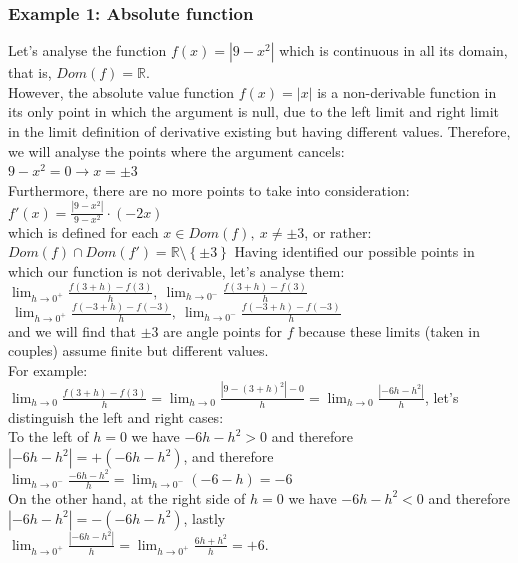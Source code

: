 \documentclass[a4paper]{report}
\begin{document}
\subsubsection{Example 1: Absolute function}
\begin{tcolorbox}
Let's analyse the function $f\left ( x \right )=\left | 9-x^{2} \right |$ which is continuous in all its domain, that is, $Dom\left ( f \right )=\mathbb{R}$.\\
However, the absolute value function $f\left ( x \right )=\left | x \right |$ is a non-derivable function in its only point in which the argument is null, due to the left limit and right limit in the limit definition of derivative existing but having different values. Therefore, we will analyse the points where the argument cancels:\\ $9-x^{2}=0\rightarrow x = \pm 3$\\Furthermore, there are no more points to take into consideration:\\
$f'\left ( x \right )=\frac{\left | 9-x^{2} \right |}{9-x^{2}}\cdot\left ( -2x \right )$\\which is defined for each $x\in Dom\left ( f \right ),\ x \neq \pm 3$, or rather:\\ $Dom\left ( f \right )\cap Dom\left ( f' \right )=\mathbb{R}\setminus\left \{  \pm3 \right \}$
\tcblower
Having identified our possible points in which our function is not derivable, let's analyse them:\\
$\lim_{h \to 0^{+}} \frac{f\left ( 3+h \right )-f\left ( 3 \right )}{h},\ \lim_{h \to 0^{-}} \frac{f\left ( 3+h \right )-f\left ( 3 \right )}{h}$\\$\ \lim_{h \to 0^{+}} \frac{f\left ( -3+h \right )-f\left ( -3 \right )}{h},\ \lim_{h \to 0^{-}} \frac{f\left ( -3+h \right )-f\left ( -3 \right )}{h}$\\and we will find that $\pm 3$ are angle points for $f$ because these limits (taken in couples) assume finite but different values.\\For example:\\
$\lim_{h \to 0} \frac{f\left ( 3+h \right )-f\left ( 3 \right )}{h}=\lim_{h \to 0}\frac{\left | 9-\left ( 3+h \right )^{2} \right |-0}{h}=\lim_{h \to 0} \frac{\left | -6h - h^{2} \right |}{h}$, let's distinguish the left and right cases:\\
To the left of $h=0$ we have $-6h - h^{2} > 0$ and therefore $\left | -6h -h^{2} \right |=+\left ( -6h-h^{2} \right )$, and therefore\\
$\lim_{h \to 0^{-}}\frac{-6h -h^{2}}{h}=\lim_{h \to 0^{-}} \left ( -6 -h \right )=-6$\\
On the other hand, at the right side of $h=0$ we have $-6h - h^{2} < 0$ and therefore $\left | -6h -h^{2} \right |=-\left ( -6h-h^{2} \right )$, lastly\\
$\lim_{h \to 0^{+}} \frac{\left | -6h - h^{2} \right |}{h}=\lim_{h \to 0^{+}}\frac{6h + h^{2}}{h}=+6$.
\end{tcolorbox}
\end{document}
